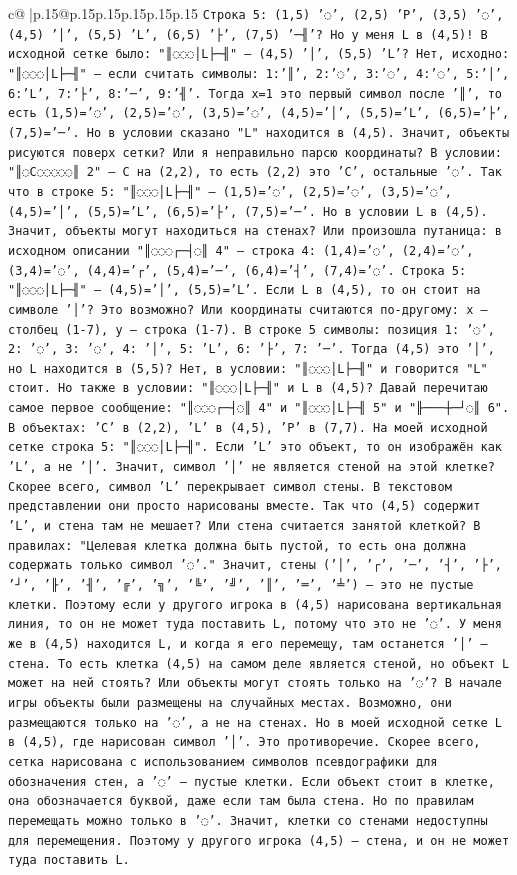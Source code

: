 \documentclass{article}
\begin{document}
{\begin{supertabular}{c@{$\;$}|p{.15\linewidth}@{}p{.15\linewidth}p{.15\linewidth}p{.15\linewidth}p{.15\linewidth}p{.15\linewidth}}
{{{\texttt{Строка 5: (1,5) '◌', (2,5) 'P', (3,5) '◌', (4,5) '│', (5,5) 'L', (6,5) '├', (7,5) '─╢'? Но у меня L в (4,5)! В исходной сетке было: "║◌◌◌│L├─╢" — (4,5) '│', (5,5) 'L'? Нет, исходно: "║◌◌◌│L├─╢" — если считать символы: 1:'║', 2:'◌', 3:'◌', 4:'◌', 5:'│', 6:'L', 7:'├', 8:'─', 9:'╢'. Тогда x=1 это первый символ после '║', то есть (1,5)='◌', (2,5)='◌', (3,5)='◌', (4,5)='│', (5,5)='L', (6,5)='├', (7,5)='─'. Но в условии сказано "L" находится в (4,5). Значит, объекты рисуются поверх сетки? Или я неправильно парсю координаты? В условии: "║◌C◌◌◌◌◌║ 2" — C на (2,2), то есть (2,2) это 'C', остальные '◌'. Так что в строке 5: "║◌◌◌│L├─╢" — (1,5)='◌', (2,5)='◌', (3,5)='◌', (4,5)='│', (5,5)='L', (6,5)='├', (7,5)='─'. Но в условии L в (4,5). Значит, объекты могут находиться на стенах? Или произошла путаница: в исходном описании "║◌◌◌┌─┤◌║ 4" — строка 4: (1,4)='◌', (2,4)='◌', (3,4)='◌', (4,4)='┌', (5,4)='─', (6,4)='┤', (7,4)='◌'. Строка 5: "║◌◌◌│L├─╢" — (4,5)='│', (5,5)='L'. Если L в (4,5), то он стоит на символе '│'? Это возможно? Или координаты считаются по{-}другому: x — столбец (1{-}7), y — строка (1{-}7). В строке 5 символы: позиция 1: '◌', 2: '◌', 3: '◌', 4: '│', 5: 'L', 6: '├', 7: '─'. Тогда (4,5) это '│', но L находится в (5,5)? Нет, в условии: "║◌◌◌│L├─╢" и говорится "L" стоит. Но также в условии: "║◌◌◌│L├─╢" и L в (4,5)? Давай перечитаю самое первое сообщение: "║◌◌◌┌─┤◌║ 4" и "║◌◌◌│L├─╢ 5" и "╟───┼─┘◌║ 6". В объектах: 'C' в (2,2), 'L' в (4,5), 'P' в (7,7). На моей исходной сетке строка 5: "║◌◌◌│L├─╢". Если 'L' это объект, то он изображён как 'L', а не '│'. Значит, символ '│' не является стеной на этой клетке? Скорее всего, символ 'L' перекрывает символ стены. В текстовом представлении они просто нарисованы вместе. Так что (4,5) содержит 'L', и стена там не мешает? Или стена считается занятой клеткой? В правилах: "Целевая клетка должна быть пустой, то есть она должна содержать только символ '◌'." Значит, стены ('│', '┌', '─', '┤', '├', '┘', '╟', '╢', '╔', '╗', '╚', '╝', '║', '═', '╧') — это не пустые клетки. Поэтому если у другого игрока в (4,5) нарисована вертикальная линия, то он не может туда поставить L, потому что это не '◌'. У меня же в (4,5) находится L, и когда я его перемещу, там останется '│' — стена. То есть клетка (4,5) на самом деле является стеной, но объект L может на ней стоять? Или объекты могут стоять только на '◌'? В начале игры объекты были размещены на случайных местах. Возможно, они размещаются только на '◌', а не на стенах. Но в моей исходной сетке L в (4,5), где нарисован символ '│'. Это противоречие. Скорее всего, сетка нарисована с использованием символов псевдографики для обозначения стен, а '◌' — пустые клетки. Если объект стоит в клетке, она обозначается буквой, даже если там была стена. Но по правилам перемещать можно только в '◌'. Значит, клетки со стенами недоступны для перемещения. Поэтому у другого игрока (4,5) — стена, и он не может туда поставить L.} \\
}}}
\end{supertabular}}
\end{document}
